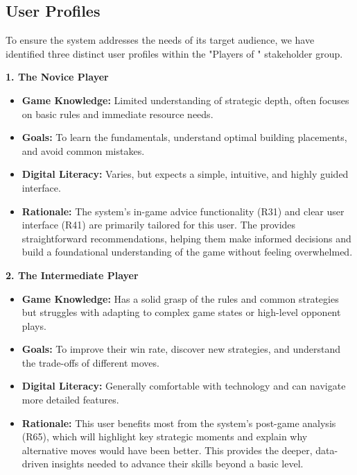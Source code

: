 \documentclass{article}
\begin{document}
\subsection{User Profiles}\label{subsec:User Profiles}
To ensure the system addresses the needs of its target audience, we have identified three distinct user profiles within the "Players of \emph{\Catan{}}" stakeholder group.

\hspace{1cm}

\noindent\textbf{1. The Novice Player}
\begin{itemize}
    \item \textbf{Game Knowledge:} Limited understanding of strategic depth, often focuses on basic rules and immediate resource needs.
    \item \textbf{Goals:} To learn the fundamentals, understand optimal building placements, and avoid common mistakes.
    \item \textbf{Digital Literacy:} Varies, but expects a simple, intuitive, and highly guided interface.
    \item \textbf{Rationale:} The system's in-game advice functionality (R31) and clear user interface (R41) are primarily tailored for this user. The \AI{} provides straightforward recommendations, helping them make informed decisions and build a foundational understanding of the game without feeling overwhelmed.
\end{itemize}

\noindent\textbf{2. The Intermediate Player}
\begin{itemize}
    \item \textbf{Game Knowledge:} Has a solid grasp of the rules and common strategies but struggles with adapting to complex game states or high-level opponent plays.
    \item \textbf{Goals:} To improve their win rate, discover new strategies, and understand the trade-offs of different moves.
    \item \textbf{Digital Literacy:} Generally comfortable with technology and can navigate more detailed features.
    \item \textbf{Rationale:} This user benefits most from the system's post-game analysis (R65), which will highlight key strategic moments and explain why alternative moves would have been better. This provides the deeper, data-driven insights needed to advance their skills beyond a basic level.
\end{itemize}
\end{document}
